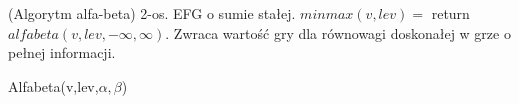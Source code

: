 \begin{twierdzenie}{(Algorytm alfa-beta)}
    2-os. EFG o sumie stałej. $minmax(v,lev)=$ return $alfabeta(v,lev,-\infty,\infty)$. Zwraca wartość gry dla równowagi doskonałej w grze o pełnej informacji.
\end{twierdzenie}
\begin{algorithm}[H]
    \SetAlgoLined
    
    \caption{Alfabeta(v,lev,$\alpha,\beta$)}
\end{algorithm}

